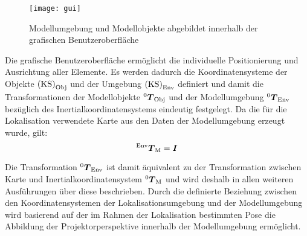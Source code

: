 \clearpage{}

\begin{figure}[!ht]
	\begin{center}
		\texttt{[image: gui]}
		\caption{Modellumgebung und Modellobjekte abgebildet innerhalb der grafischen Benutzeroberfläche}
		\label{fig.modscene}
	\end{center}
\end{figure}

\prever{
}

Die grafische Benutzeroberfläche ermöglicht die individuelle Positionierung und Ausrichtung aller Elemente. Es werden dadurch die Koordinatensysteme der Objekte ${\mathrm{(KS)}}_{\mathrm{Obj}}$ und der Umgebung ${\mathrm{(KS)}}_{\mathrm{Env}}$ definiert und damit die Transformationen der Modellobjekte ${^{\mathrm{0}}\mbox{\boldmath{$T$}}_{\mathrm{Obj}}}$ und der Modellumgebung ${^{\mathrm{0}}\mbox{\boldmath{$T$}}_{\mathrm{Env}}}$ bezüglich des Inertialkoordinatensystems eindeutig festgelegt. Da die für die Lokalisation verwendete Karte aus den Daten der Modellumgebung erzeugt wurde, gilt:
%
\begin{equation}
{^{\mathrm{Env}}\mbox{\boldmath{$T$}}_{\mathrm{M}}}=\mbox{\boldmath{$I$}}
\end{equation}


\prever{
\red[Einheitsmatrix mit n=4?\\]
}

Die Transformation ${^{\mathrm{0}}\mbox{\boldmath{$T$}}_{\mathrm{Env}}}$ ist damit äquivalent zu der Transformation zwischen Karte und Inertialkoordinatensystem ${^{\mathrm{0}}\mbox{\boldmath{$T$}}_{\mathrm{M}}}$ und wird deshalb in allen weiteren Ausführungen über diese beschrieben. Durch die definierte Beziehung zwischen den Koordinatensystemen der Lokalisationsumgebung und der Modellumgebung wird basierend auf der im Rahmen der Lokalisation bestimmten Pose die Abbildung der Projektorperspektive innerhalb der Modellumgebung ermöglicht.
\prever{
}

